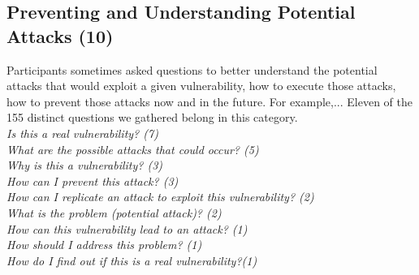 \documentclass[conference]{IEEEtran}
\begin{document}








\noindent\subsection{\textbf{Preventing and Understanding Potential Attacks (10)}}\label{pupa}

Participants sometimes asked questions to better understand the potential attacks that would exploit a given vulnerability, how to execute those attacks, how to prevent those attacks now and in the future. 
For example,...
Eleven of the 155 distinct questions we gathered belong in this category.
\\ 

\noindent\emph{Is this a real vulnerability? (7)} \\
\emph{What are the possible attacks that could occur? (5)} \\
\emph{Why is this a vulnerability? (3)} \\
\emph{How can I prevent this attack? (3)} \\
\emph{How can I replicate an attack to exploit this vulnerability? (2)} \\
\emph{What is the problem (potential attack)? (2)} \\
\emph{How can this vulnerability lead to an attack? (1)} \\
\emph{How should I address this problem? (1)} \\
\emph{How do I find out if this is a real vulnerability?(1)} \\
\end{document}
